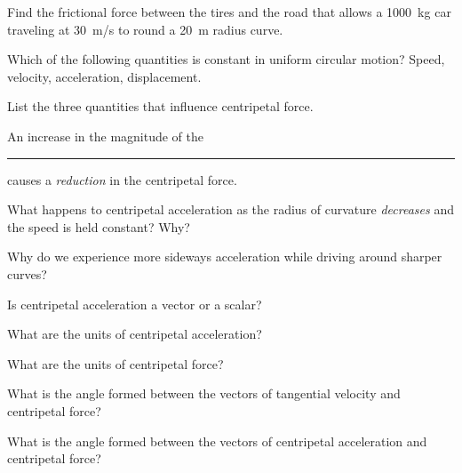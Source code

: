 \documentclass[main-physics.tex]{subfiles}
\begin{document}
\begin{exercise} \label{MJm5VE}
    Find the frictional force between the tires and the road that allows a \SI{1000}{kg} car traveling at \SI{30}{m/s} to round a \SI{20}{m} radius curve.
\end{exercise}

\begin{exercise} \label{fsjtBV}
    Which of the following quantities is constant in uniform circular motion? Speed, velocity, acceleration, displacement.
\end{exercise}

\begin{exercise} \label{GD8Yff}
    List the three quantities that influence centripetal force.
\end{exercise}

\begin{exercise} \label{aEtlVz}
    An increase in the magnitude of the \rule{2cm}{0.15mm} causes a \textit{reduction} in the centripetal force.
\end{exercise}

\begin{exercise} \label{5lauZ6}
    What happens to centripetal acceleration as the radius of curvature \textit{decreases} and the speed is held constant? Why?
\end{exercise}

\begin{exercise} \label{KB7t4k}
    Why do we experience more sideways acceleration while driving around sharper curves?
\end{exercise}

\begin{exercise} \label{jb3iGO}
    Is centripetal acceleration a vector or a scalar?
\end{exercise}

\begin{exercise} \label{TUxTQh}
    What are the units of centripetal acceleration?
\end{exercise}

\begin{exercise} \label{9YKhPo}
    What are the units of centripetal force?
\end{exercise}

\begin{exercise} \label{wS6Htw}
    What is the angle formed between the vectors of tangential velocity and centripetal force?
\end{exercise}

\begin{exercise} \label{barV9C}
    What is the angle formed between the vectors of centripetal acceleration and centripetal force?
\end{exercise}
\end{document}
